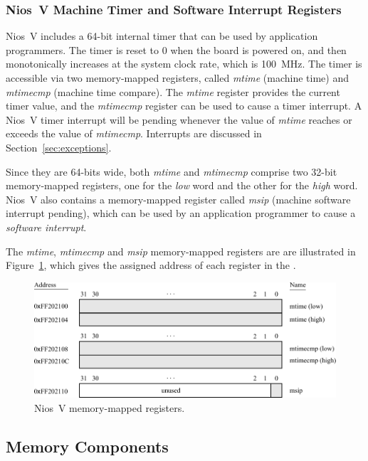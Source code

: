 \subsubsection{Nios~V Machine Timer and Software Interrupt Registers}
\label{sec:mtimer}
Nios~V includes a 64-bit internal timer that can be used by application programmers. 
The timer is reset to 0 when the {\DEBoard} board is powered on, and then monotonically
increases at the system clock rate, which is 100~MHz. The timer is accessible via two 
memory-mapped registers, 
called {\it mtime} (machine time) and {\it mtimecmp} (machine time compare). The 
{\it mtime} register provides the current timer value, and the {\it mtimecmp} register 
can be used to cause a timer interrupt. A Nios~V timer interrupt will be pending whenever 
the value of {\it mtime} reaches or exceeds the value of {\it mtimecmp}. Interrupts are 
discussed in Section~\ref{sec:exceptions}.

Since they are 64-bits wide, both {\it mtime} and {\it mtimecmp} comprise two 32-bit 
memory-mapped registers, one for the {\it low} word and the other for the {\it high} word. 
Nios~V also contains a memory-mapped register called {\it msip} (machine software interrupt
pending), which can be used by an application programmer to cause a {\it software interrupt}.

The {\it mtime}, {\it mtimecmp} and {\it msip} memory-mapped registers are 
are illustrated in Figure~\ref{fig:mm_control}, which gives the assigned address of each 
register in the {\it \systemNameFull}.

\begin{figure}[h]
   \begin{center}
      \includegraphics[scale=.9]{figures/mm_control_registers.pdf}
   \caption{Nios~V memory-mapped registers.} 
	 \label{fig:mm_control}
	 \end{center}
\end{figure}

\subsection{Memory Components}

